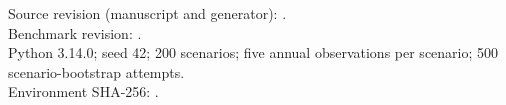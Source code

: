 Source revision (manuscript and generator): .\\
Benchmark revision: .\\
Python 3.14.0; seed 42; 200 scenarios; five annual observations per scenario; 500 scenario-bootstrap attempts.\\
Environment SHA-256: .
